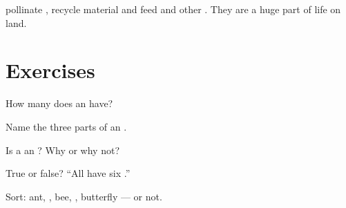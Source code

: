 \begin{proposition}\label{prop:g3:insects:matter}
 pollinate , recycle material and feed  and other
. They are a huge part of  life on land.
\end{proposition}
\admitted

\section{Exercises}

\begin{exercise}[$\star$]\label{exo:g3:insects:1}
How many  does an  have?
\end{exercise}

\begin{exercise}[$\star$]\label{exo:g3:insects:2}
Name the three  parts of an .
\end{exercise}

\begin{exercise}[$\star$]\label{exo:g3:insects:3}
Is a  an ? Why or why not?
\end{exercise}

\begin{exercise}[$\star$]\label{exo:g3:insects:4}
True or false? ``All  have six .''
\end{exercise}

\begin{exercise}[$\star\star$]\label{exo:g3:insects:5}
Sort: ant, , bee, , butterfly ---  or not.
\end{exercise}

